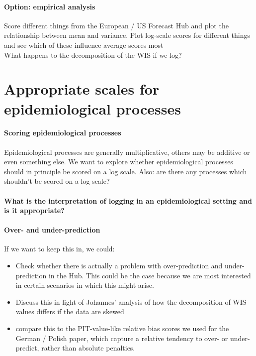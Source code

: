 \documentclass{article}
\begin{document}
\paragraph{Option: empirical analysis} 
Score different things from the European / US Forecast Hub and plot the relationship between mean and variance. Plot log-scale scores for different things and see which of these influence average scores most \\
What happens to the decomposition of the WIS if we log? 



\section{Appropriate scales for epidemiological processes}

\paragraph{Scoring epidemiological processes}
Epidemiological processes are generally multiplicative, others may be additive or even something else. We want to explore whether epidemiological processes should in principle be scored on a log scale. Also: are there any processes which shouldn't be scored on a log scale? 

\paragraph{What is the interpretation of logging in an epidemiological setting and is it appropriate?}

\paragraph{Over- and under-prediction}
If we want to keep this in, we could: 
\begin{itemize}
    \item Check whether there is actually a problem with over-prediction and under-prediction in the Hub. This could be the case because we are most interested in certain scenarios in which this might arise. 
    \item Discuss this in light of Johannes' analysis of how the decomposition of WIS values differs if the data are skewed
    \item compare this to the PIT-value-like relative bias scores we used for the German / Polish paper, which capture a relative tendency to over- or under-predict, rather than absolute penalties. 
\end{itemize}
\end{document}
